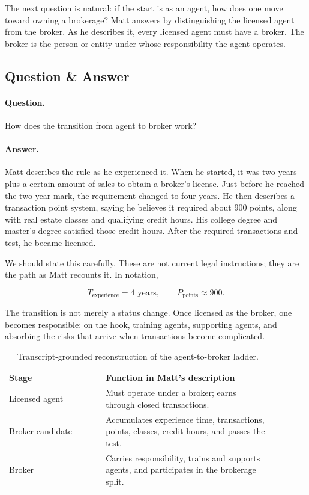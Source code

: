 The next question is natural: if the start is as an agent, how does one move toward owning a brokerage? Matt answers by distinguishing the licensed agent from the broker. As he describes it, every licensed agent must have a broker. The broker is the person or entity under whose responsibility the agent operates.

\subsection{Question \& Answer}

\paragraph{Question.}
How does the transition from agent to broker work?

\paragraph{Answer.}
Matt describes the rule as he experienced it. When he started, it was two years plus a certain amount of sales to obtain a broker's license. Just before he reached the two-year mark, the requirement changed to four years. He then describes a transaction point system, saying he believes it required about 900 points, along with real estate classes and qualifying credit hours. His college degree and master's degree satisfied those credit hours. After the required transactions and test, he became licensed.

We should state this carefully. These are not current legal instructions; they are the path as Matt recounts it. In notation,

\begin{equation}
T_{\text{experience}}=4\text{ years},
\qquad
P_{\text{points}}\approx 900 .
\end{equation}

The transition is not merely a status change. Once licensed as the broker, one becomes responsible: on the hook, training agents, supporting agents, and absorbing the risks that arrive when transactions become complicated.

\begin{table}
\centering
\begin{tabular}{|p{0.32\linewidth}|p{0.56\linewidth}|}
\hline
Stage & Function in Matt's description \\
\hline
Licensed agent & Must operate under a broker; earns through closed transactions. \\
\hline
Broker candidate & Accumulates experience time, transactions, points, classes, credit hours, and passes the test. \\
\hline
Broker & Carries responsibility, trains and supports agents, and participates in the brokerage split. \\
\hline
\end{tabular}
\caption{Transcript-grounded reconstruction of the agent-to-broker ladder.}
\end{table}

